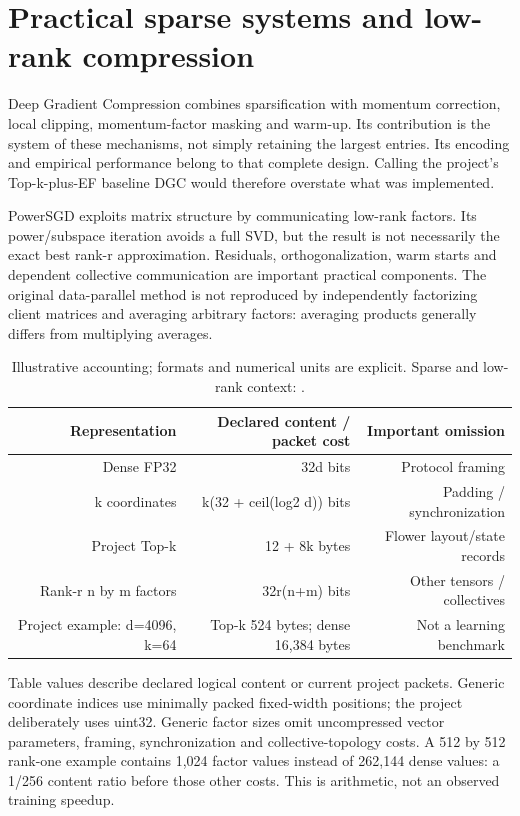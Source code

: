 \section{Practical sparse systems and low-rank compression}

Deep Gradient Compression combines sparsification with momentum correction, local clipping, momentum-factor masking and warm-up. Its contribution is the system of these mechanisms, not simply retaining the largest entries. Its encoding and empirical performance belong to that complete design. Calling the project's Top-k-plus-EF baseline DGC would therefore overstate what was implemented. \parencite{lin2018dgc}

PowerSGD exploits matrix structure by communicating low-rank factors. Its power/subspace iteration avoids a full SVD, but the result is not necessarily the exact best rank-r approximation. Residuals, orthogonalization, warm starts and dependent collective communication are important practical components. The original data-parallel method is not reproduced by independently factorizing client matrices and averaging arbitrary factors: averaging products generally differs from multiplying averages. \parencite{vogels2019powersgd}

\begin{table}[htbp]
\centering
\small
\begin{tabularx}{\textwidth}{R{0.75000}R{1.29000}R{0.96000}}
\toprule
\textbf{Representation} & \textbf{Declared content / packet cost} & \textbf{Important omission} \\\midrule
Dense FP32 & 32d bits & Protocol framing \\
k coordinates & k(32 + ceil(log2 d)) bits & Padding / synchronization \\
Project Top-k & 12 + 8k bytes & Flower layout/state records \\
Rank-r n by m factors & 32r(n+m) bits & Other tensors / collectives \\
Project example: d=4096, k=64 & Top-k 524 bytes; dense 16,384 bytes & Not a learning benchmark \\
\bottomrule
\end{tabularx}
\caption{Illustrative accounting; formats and numerical units are explicit. Sparse and low-rank context: \parencite{stich2018memory,vogels2019powersgd}.}
\label{tab:costs}
\end{table}

Table values describe declared logical content or current project packets. Generic coordinate indices use minimally packed fixed-width positions; the project deliberately uses uint32. Generic factor sizes omit uncompressed vector parameters, framing, synchronization and collective-topology costs. A 512 by 512 rank-one example contains 1,024 factor values instead of 262,144 dense values: a 1/256 content ratio before those other costs. This is arithmetic, not an observed training speedup.

